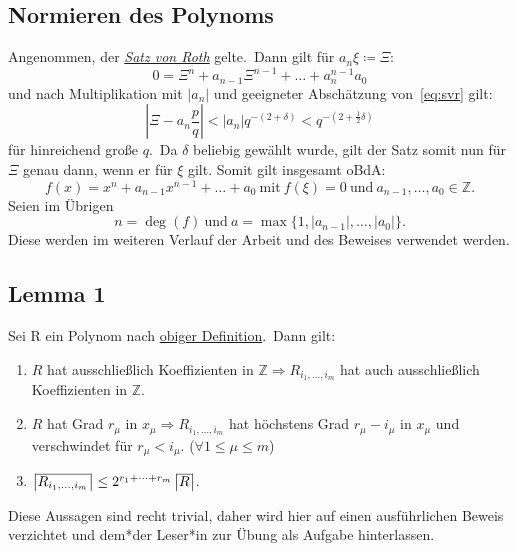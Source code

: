     \subsection{Normieren des Polynoms}
        \label{subsec:norm-poly}
        \textrm{Angenommen, der \hyperref[eq:svr]{\emph{Satz von Roth}} gelte.\ Dann gilt für $a_n \xi \coloneq \Xi$:}
        \begin{equation*}
            0 = \Xi^n + a_{n-1} \Xi^{n-1} + \dots + a_n^{n-1} a_0
        \end{equation*}
        \textrm{und nach Multiplikation mit $\left| a_n \right|$ und geeigneter Abschätzung von~\eqref{eq:svr} gilt:}
        \begin{equation*}
            \left| \Xi - a_n \frac{p}{q} \right| < \left| a_n \right| q^{-(2+\delta)} < q^{-(2+\frac{1}{2}\delta)}
        \end{equation*}
        \textrm{für hinreichend große $q$.\ Da $\delta$ beliebig gewählt wurde, gilt der Satz somit nun für $\Xi$
            genau dann, wenn er für $\xi$ gilt. Somit gilt insgesamt oBdA:}
        \begin{equation}
            f(x) = x^n + a_{n-1} x^{n-1} + \dots + a_0 \  \text{mit} \  f(\xi) = 0 \  \text{und} \  a_{n-1}, \dots,
            a_0 \in \mathbb{Z}. \label{eq:prereq}
        \end{equation}
        \newline
        \textrm{Seien im Übrigen}
        \begin{equation}
            n = \deg(f) \  \text{und} \  a = \max\{ 1, | a_{n-1} |, \dots, | a_0 | \}. \label{eq:def-n-a}
        \end{equation}
        \newline
        Diese werden im weiteren Verlauf der Arbeit und des Beweises verwendet werden.
    
    
    
    \subsection{Lemma 1}
        \label{subsec:lemma1}
        Sei R ein Polynom nach \hyperref[subsubsec:def-poly]{obiger Definition}.\ Dann gilt:
        \begin{enumerate}
            \item \textrm{$R$ hat ausschließlich Koeffizienten in $\mathbb{Z} \Rightarrow R_{i_1, \dots, i_m}$ hat
            auch ausschließlich Koeffizienten in $\mathbb{Z}$.}
            \item \textrm{$R$ hat Grad $r_\mu$ in $x_\mu \Rightarrow R_{i_1, \dots, i_m}$ hat höchstens Grad $r_\mu
            - i_\mu$ in $x_\mu$ und verschwindet für $r_\mu < i_\mu$. ($\forall 1 \leq \mu \leq m$)}
            \item $\content{R_{i_1, \dots, i_m}} \leq 2^{r_1 + \dots + r_m} \content{R}$.
        \end{enumerate}
        \textrm{Diese Aussagen sind recht trivial, daher wird hier auf einen ausführlichen Beweis
        verzichtet und dem*der Leser*in zur Übung als Aufgabe hinterlassen.}
    
